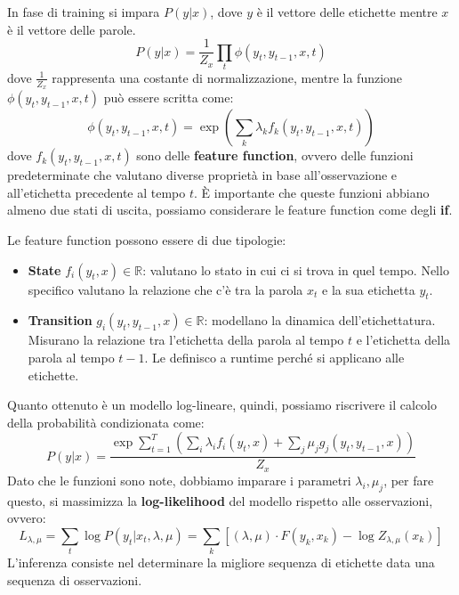 In fase di training si impara $P(y|x)$, dove $y$ è il vettore delle etichette
mentre $x$ è il vettore delle parole.
\begin{equation}
      P(y|x) = \frac{1}{Z_x} \prod_t \phi(y_t,y_{t-1},x ,t)
\end{equation}
dove $\frac{1}{Z_x}$ rappresenta una costante di normalizzazione, mentre la
funzione $\phi(y_t,y_{t-1},x ,t)$ può essere scritta come:
\begin{equation}
      \phi(y_t,y_{t-1},x ,t) = \exp (\sum_k\lambda_k f_k(y_t,y_{t-1},x,t))
\end{equation}
dove $f_k(y_t,y_{t-1},x,t)$ sono delle \textbf{feature function}, ovvero delle
funzioni predeterminate che valutano diverse proprietà in base all'osservazione e
all'etichetta precedente al tempo $t$. È importante che queste funzioni abbiano
almeno due stati di uscita, possiamo considerare le feature function come degli
\textbf{if}.

Le feature function possono essere di due tipologie:
\begin{itemize}
      \item \textbf{State} $f_i(y_t, x) \in \mathbb{R}$: valutano lo stato in
            cui ci si trova in quel tempo. Nello specifico valutano la relazione
            che c'è tra la parola $x_t$ e la sua etichetta $y_t$.
      \item \textbf{Transition} $g_i(y_t, y_{t - 1}, x) \in \mathbb{R}$: modellano
            la dinamica dell'etichettatura. Misurano la relazione tra l'etichetta
            della parola al tempo $t$ e l'etichetta della parola al tempo $t - 1$.
            Le definisco a runtime perché si applicano alle etichette.
\end{itemize}

Quanto ottenuto è un modello log-lineare, quindi, possiamo riscrivere il calcolo
della probabilità condizionata come:
\begin{equation}
      P(y|x) = \frac{\exp \sum_{t = 1}^T\left( \sum_i \lambda_i f_i(y_t,x) +
      \sum_j \mu_j g_j(y_t,y_{t-1},x) \right)}{Z_x}
\end{equation}
Dato che le funzioni sono note, dobbiamo imparare i parametri $\lambda_i, \mu_j$,
per fare questo, si massimizza la \textbf{log-likelihood} del modello rispetto
alle osservazioni, ovvero:
\begin{equation}
      L_{\lambda,\mu} = \sum_{t} \log P(y_t|x_t, \lambda, \mu) = \sum_k \left[
            (\lambda, \mu) \cdot F(y_k, x_k) - \log Z_{\lambda, \mu}(x_k) \right]
\end{equation}
L'inferenza consiste nel determinare la migliore sequenza di etichette data una
sequenza di osservazioni.

